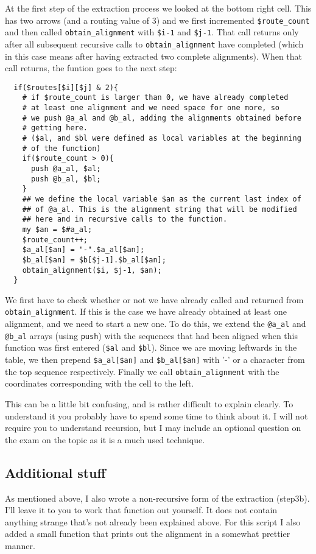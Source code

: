 \documentclass[11pt]{article}
\renewcommand\scriptsize\normalsize
\begin{document}
At the first step of the extraction process we looked at the bottom right cell. This has
two arrows (and a routing value of 3) and we first incremented \verb|$route_count| and then
called \verb|obtain_alignment| with \verb|$i-1| and \verb|$j-1|. That call returns only
after all subsequent recursive calls to \verb|obtain_alignment| have completed (which in this
case means after having extracted two complete alignments). When that call returns, the funtion
goes to the next step:

\begin{verbatim}
  if($routes[$i][$j] & 2){
    # if $route_count is larger than 0, we have already completed
    # at least one alignment and we need space for one more, so
    # we push @a_al and @b_al, adding the alignments obtained before
    # getting here.
    # ($al, and $bl were defined as local variables at the beginning 
    # of the function)
    if($route_count > 0){  
      push @a_al, $al;
      push @b_al, $bl;
    }
    ## we define the local variable $an as the current last index of
    ## of @a_al. This is the alignment string that will be modified
    ## here and in recursive calls to the function.
    my $an = $#a_al;
    $route_count++;
    $a_al[$an] = "-".$a_al[$an];
    $b_al[$an] = $b[$j-1].$b_al[$an];
    obtain_alignment($i, $j-1, $an); 
  }
\end{verbatim}
 
We first have to check whether or not we have already called and returned from
\verb|obtain_alignment|. If this is the case we have already obtained at least
one alignment, and we need to start a new one. To do this, we extend the \verb|@a_al| and
\verb|@b_al| arrays (using \verb|push|) with the sequences that had been aligned when this
function was first entered (\verb|$al| and \verb|$bl|).
Since we are moving leftwards in the table, we then prepend \verb|$a_al[$an]| and \verb|$b_al[$an]|
with '-' or a character from the top sequence respectively. Finally we call 
\verb|obtain_alignment| with the coordinates corresponding with the cell to the left.

This can be a little bit confusing, and is rather difficult to explain clearly. To understand
it you probably have to spend some time to think about it. I will not require you to understand
recursion, but I may include an optional question on the exam on the topic as it is a much
used technique.

\subsection{Additional stuff}
\label{sec-1-4}
As mentioned above, I also wrote a non-recursive form of the extraction (step3b). 
I'll leave it to you to work that function out yourself. It does not contain
anything strange that's not already been explained above. For this script I also added
a small function that prints out the alignment in a somewhat prettier manner.
\end{document}
